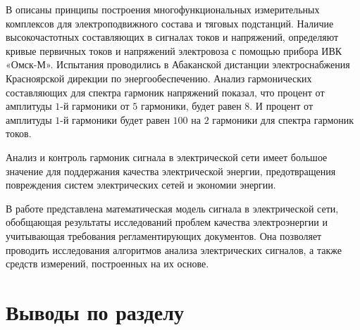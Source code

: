 В \cite{Improving_methods_Shizma_2014, ramos2017power}описаны принципы построения многофункциональных измерительных комплексов для электроподвижного состава и тяговых подстанций.
Наличие высокочастотных составляющих в сигналах токов и напряжений, определяют кривые первичных токов и напряжений электровоза с помощью прибора ИВК «Омск-М». Испытания проводились в Абаканской дистанции электроснабжения Красноярской дирекции по энергообеспечению. Анализ гармонических составляющих для спектра гармоник напряжений показал, что процент от амплитуды $1$-й гармоники от $5$ гармоники, будет равен $8$. И процент от амплитуды $1$-й гармоники будет равен $100$ на $2$ гармоники для спектра гармоник токов.

Анализ и контроль гармоник сигнала в электрической сети имеет большое значение для поддержания качества электрической энергии, предотвращения повреждения систем электрических сетей и экономии энергии. 

В работе представлена математическая модель сигнала в электрической сети, обобщающая результаты исследований проблем качества электроэнергии и учитывающая требования регламентирующих документов. Она позволяет проводить исследования алгоритмов анализа электрических сигналов, а также средств измерений, построенных на их основе.

\section{Выводы по разделу} \label{sec:ch1/sec4} 

